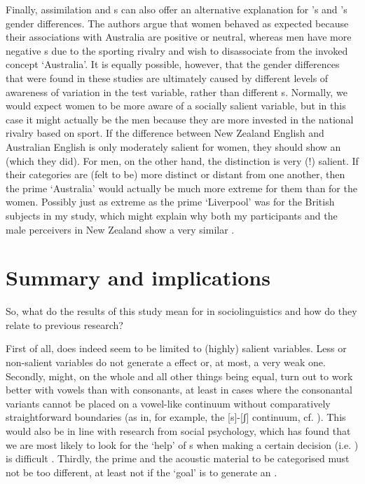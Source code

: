 Finally, assimilation and s can also offer an alternative explanation for \textcite{hayetal2006a}'s and \textcite{haydrager2010}'s gender differences.
The authors argue that women behaved as expected because their associations with Australia are positive or neutral, whereas men have more negative s due to the sporting rivalry and wish to disassociate from the invoked concept `Australia'.
It is equally possible, however, that the gender differences that were found in these studies are ultimately caused by different levels of awareness of variation in the test variable, rather than different s.
Normally, we would expect women to be more aware of a socially salient variable, but in this case it might actually be the men because they are more invested in the national rivalry based on sport.
If the difference between New Zealand English and Australian English is only moderately salient for women, they should show an  (which they did).
For men, on the other hand, the distinction is very (!) salient.
If their categories are (felt to be) more distinct or distant from one another, then the prime `Australia' would actually be much more extreme for them than for the women.
Possibly just as extreme as the prime `Liverpool' was for the British subjects in my study, which might explain why both my participants and the male perceivers in New Zealand show a very similar .

	\section{Summary and implications}

So, what do the results of this study mean for   in sociolinguistics and how do they relate to previous research?

First of all,  does indeed seem to be limited to (highly) salient variables.
Less or non-salient variables do not generate a  effect or, at most, a very weak one.
Secondly,  might, on the whole and all other things being equal, turn out to work better with vowels than with consonants, at least in cases where the consonantal variants cannot be placed on a vowel-like continuum without comparatively straightforward boundaries (as in, for example, the [s]-[ʃ] continuum, cf. \citealt{strand1999}).
This would also be in line with research from social psychology, which has found that we are most likely to look for the `help' of s when making a certain decision (i.e. ) is difficult \parencite[cf.][28]{petersensix2008}.
Thirdly, the prime and the acoustic material to be categorised must not be too different, at least not if the `goal' is to generate an .

